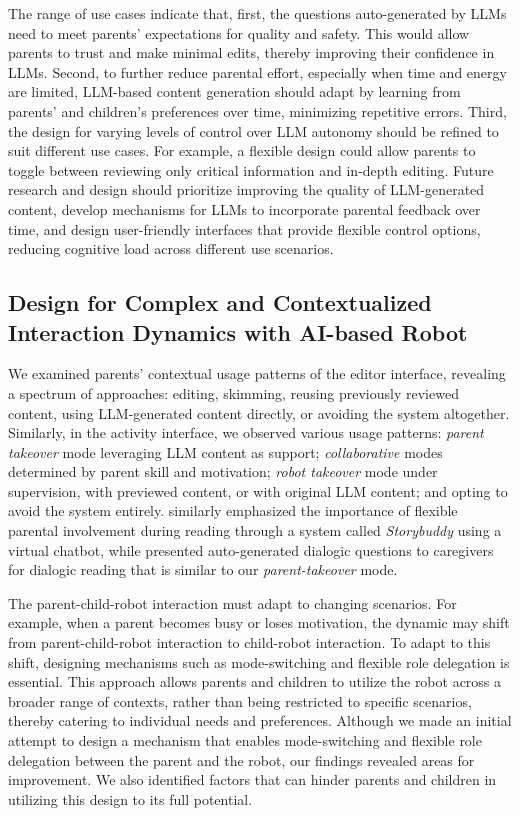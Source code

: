 The range of use cases indicate that, first, the questions auto-generated by LLMs need to meet parents' expectations for quality and safety. This would allow parents to trust and make minimal edits, thereby improving their confidence in LLMs. Second, to further reduce parental effort, especially when time and energy are limited, LLM-based content generation should adapt by learning from parents' and children's preferences over time, minimizing repetitive errors. Third, the design for varying levels of control over LLM autonomy should be refined to suit different use cases. For example, a flexible design could allow parents to toggle between reviewing only critical information and in-depth editing. Future research and design should prioritize improving the quality of LLM-generated content, develop mechanisms for LLMs to incorporate parental feedback over time, and design user-friendly interfaces that provide flexible control options, reducing cognitive load across different use scenarios.

\subsection{Design for Complex and Contextualized Interaction Dynamics with AI-based Robot} %
We examined parents' contextual usage patterns of the editor interface, revealing a spectrum of approaches: editing, skimming, reusing previously reviewed content, using LLM-generated content directly, or avoiding the system altogether. Similarly, in the activity interface, we observed various usage patterns: \textit{parent takeover} mode leveraging LLM content as support; \textit{collaborative} modes determined by parent skill and motivation; \textit{robot takeover} mode under supervision, with previewed content, or with original LLM content; and opting to avoid the system entirely. \citet{zhang2022storybuddy} similarly emphasized the importance of flexible parental involvement during reading through a system called \textit{Storybuddy} using a virtual chatbot, while \citet{dietz2024contextq} presented auto-generated dialogic questions to caregivers for dialogic reading that is similar to our \textit{parent-takeover} mode. 

The parent-child-robot interaction must adapt to changing scenarios. For example, when a parent becomes busy or loses motivation, the dynamic may shift from parent-child-robot interaction to child-robot interaction. To adapt to this shift, designing mechanisms such as mode-switching and flexible role delegation is essential. This approach allows parents and children to utilize the robot across a broader range of contexts, rather than being restricted to specific scenarios, thereby catering to individual needs and preferences. Although we made an initial attempt to design a mechanism that enables mode-switching and flexible role delegation between the parent and the robot, our findings revealed areas for improvement. We also identified factors that can hinder parents and children in utilizing this design to its full potential. 

